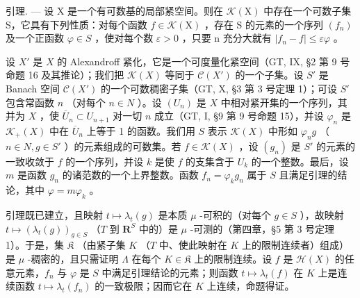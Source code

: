 引理. --- 设 X 是一个有可数基的局部紧空间。则在 \(\mathcal{K}(\mathrm{X})\) 中存在一个可数子集 S，它具有下列性质：对每个函数 \(f \in \mathcal{K}(\mathrm{X})\) ，存在 S 的元素的一个序列 \((f_n)\) 及一个正函数 \(\varphi \in S\) ，使对每个数 \(\varepsilon > 0\) ，只要 n 充分大就有 \(|f_n - f| \leqslant \varepsilon \varphi\) 。

设 \(X'\) 是 \(X\) 的 Alexandroff 紧化，它是一个可度量化紧空间（GT, IX, §2 第 9 号命题 16 及其推论）；我们把 \(\mathcal{K}(X)\) 等同于 \(\mathcal{C}(X')\) 的一个子集。设 \(S'\) 是 Banach 空间 \(\mathcal{C}(X')\) 的一个可数稠密子集（GT, X, §3 第 3 号定理 1）；可设 \(S'\) 包含常函数 \(n\) （对每个 \(n \in N\) ）。设 \((U_n)\) 是 \(X\) 中相对紧开集的一个序列，其并为 \(X\) ，使 \(\overline{U}_n \subset U_{n+1}\) 对一切 \(n\) 成立（GT, I, §9 第 9 号命题 15），并设 \(\varphi_n\) 是 \(\mathcal{K}_+(X)\) 中在 \(\overline{U}_n\) 上等于 1 的函数。我们用 \(S\) 表示 \(\mathcal{K}(X)\) 中形如 \(\varphi_n g\) （ \(n \in N, g \in S'\) ）的元素组成的可数集。若 \(f \in \mathcal{K}(X)\) ，设 \((g_n)\) 是 \(S'\) 的元素的一致收敛于 \(f\) 的一个序列，并设 \(k\) 是使 \(f\) 的支集含于 \(U_k\) 的一个整数。最后，设 \(m\) 是函数 \(g_n\) 的诸范数的一个上界整数。函数 \(f_n = \varphi_k g_n\) 属于 \(S\) 且满足引理的结论，其中 \(\varphi = m\varphi_k\) 。

引理既已建立，且映射 \(t \mapsto \lambda_t(g)\) 是本质 \(\mu\) -可积的（对每个 \(g \in S\) ），故映射 \(t \mapsto (\lambda_t(g))_{g \in S}\) （\(T\) 到 \(\mathbf{R}^S\) 中的）是 \(\mu\) -可测的（第四章，§5 第 3 号定理 1）。于是，集 \(\mathfrak{K}\) （由紧子集 \(K\) （\(T\) 中、使此映射在 \(K\) 上的限制连续者）组成）是 \(\mu\) -稠密的，且只需证明 \(\Lambda\) 在每个 \(K \in \mathfrak{K}\) 上的限制连续。设 \(f\) 是 \(\mathcal{H}(X)\) 的任意元素，\(f_n\) 与 \(\varphi\) 是 \(S\) 中满足引理结论的元素；则函数 \(t \mapsto \lambda_t(f)\) 在 \(K\) 上是连续函数 \(t \mapsto \lambda_t(f_n)\) 的一致极限；因而它在 \(K\) 上连续，命题得证。
\relax{}

